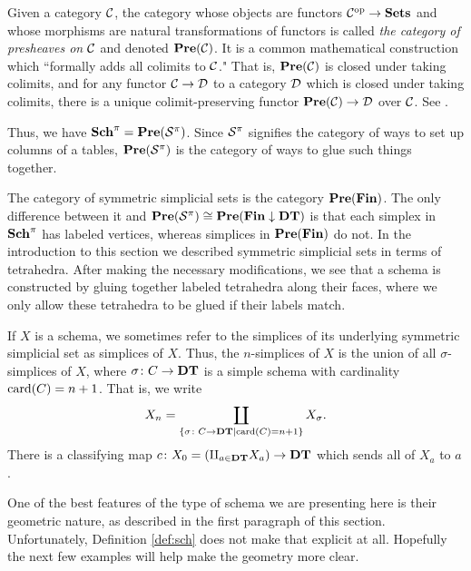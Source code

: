 \documentclass{amsart}
\def\DT{{\bf DT}}
\def\Sch{{\bf Sch}}
\def\Fin{{\bf Fin}}
\def\card{\tn{card}}
\begin{document}
\begin{remark}\label{rem:sch and fin}

Given a category $\mathcal{C}$, the category whose objects are functors $\mathcal{C}^\textnormal{op}\rightarrow{\bf Sets}$ and whose morphisms are natural transformations of functors is called {\em the category of presheaves on $\mathcal{C}$} and denoted ${\bf Pre}(\mathcal{C})$.  It is a common mathematical construction which ``formally adds all colimits to $\mathcal{C}$."  That is, ${\bf Pre}(\mathcal{C})$ is closed under taking colimits, and for any functor $\mathcal{C}\rightarrow\mathcal{D}$ to a category $\mathcal{D}$ which is closed under taking colimits, there is a unique colimit-preserving functor ${\bf Pre}(\mathcal{C})\rightarrow\mathcal{D}$ over $\mathcal{C}$.  See \cite{}.

Thus, we have $\Sch^\pi=\Pre(\mcS^\pi)$.  Since $\mathcal{S}^\pi$ signifies the category of ways to set up columns of a tables, ${\bf Pre}(\mathcal{S}^\pi)$ is the category of ways to glue such things together.

\end{remark}

\begin{remark}\label{rem:symmetric}

The category of symmetric simplicial sets is the category $\Pre(\Fin)$.  The only difference between it and $\Pre(\mcS^\pi)\iso\Pre(\Fin\down\DT)$ is that each simplex in $\Sch^\pi$ has labeled vertices, whereas simplices in $\Pre(\Fin)$ do not.  In the introduction to this section we described symmetric simplicial sets in terms of tetrahedra.  After making the necessary modifications, we see that a schema is constructed by gluing together labeled tetrahedra along their faces, where we only allow these tetrahedra to be glued if their labels match.

If $X$ is a schema, we sometimes refer to the simplices of its underlying symmetric simplicial set as simplices of $X$.  Thus, the $n$-simplices of $X$ is the union of all $\sigma$-simplices of $X$, where $\sigma\taking C\to\DT$ is a simple schema with cardinality $\card(C)=n+1$.  That is, we write $$X_n=\coprod_{\{\sigma\taking C\to\DT| \card(C)=n+1\}}X_\sigma.$$  There is a classifying map $c\taking X_0=\left(\amalg_{a\in\DT}X_a\right)\to\DT$ which sends all of $X_a$ to $a$.

\end{remark}

One of the best features of the type of schema we are presenting here is their geometric nature, as described in the first paragraph of this section.  Unfortunately, Definition \ref{def:sch} does not make that explicit at all.  Hopefully the next few examples will help make the geometry more clear.
\end{document}
